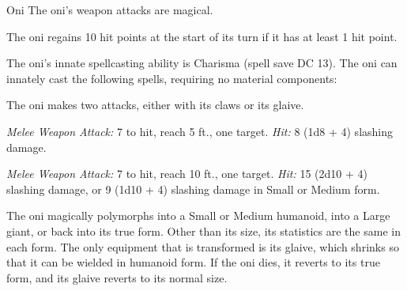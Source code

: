 \documentclass[10pt,a4paper,twoside,bg=print,twocolumn,openany,nodeprecatedcode]{dndbook}
\begin{document}
\begin{DndMonster}[float=t]{Oni}
\DndMonsterBasics[
armor-class = {16 (\textit{chain mail})},
hit-points = {\DndDice{13d10 + 39}},
speed = {30 ft., fly 30 ft.}
]
\DndMonsterAbilityScores[
 str = 19,
 dex = 11,
 con = 16,
 int = 14,
 wis = 12,
 cha = 15
]
\DndMonsterDetails[
saving-throws = {Dex +3, Con +6, Wis +4, Cha +5},
skills = {Arcana +5, Deception +8, Perception +4},
senses = {darkvision 60 ft., passive perception 14},
languages = {Common, Giant},
challenge = 7,
]
The oni's weapon attacks are magical.

The oni regains 10 hit points at the start of its turn if it has at least 1 hit point.

The oni's innate spellcasting ability is Charisma (spell save DC 13). The oni can innately cast the following spells, requiring no material components:
\begin{DndMonsterSpells}
\end{DndMonsterSpells}
The oni makes two attacks, either with its claws or its glaive.

\textsl{Melee Weapon Attack:} 7 to hit, reach 5 ft., one target. \textsl{Hit:} 8 (1d8 + 4) slashing damage.

\textsl{Melee Weapon Attack:} 7 to hit, reach 10 ft., one target. \textsl{Hit:} 15 (2d10 + 4) slashing damage, or 9 (1d10 + 4) slashing damage in Small or Medium form.

The oni magically polymorphs into a Small or Medium humanoid, into a Large giant, or back into its true form. Other than its size, its statistics are the same in each form. The only equipment that is transformed is its glaive, which shrinks so that it can be wielded in humanoid form. If the oni dies, it reverts to its true form, and its glaive reverts to its normal size.

\end{DndMonster}
\end{document}
